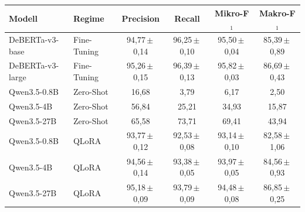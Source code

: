 \begin{tabular}{llcccc}
    \toprule
    \textbf{Modell} & \textbf{Regime} & \textbf{Precision} &
    \textbf{Recall} & \textbf{Mikro-F$_1$} & \textbf{Makro-F$_1$} \\
    \midrule
    DeBERTa-v3-base & Fine-Tuning & 94,77\,$\pm$\,0,14 & 96,25\,$\pm$\,0,10 & 95,50\,$\pm$\,0,04 & 85,39\,$\pm$\,0,89 \\
    DeBERTa-v3-large & Fine-Tuning & 95,26\,$\pm$\,0,15 & 96,39\,$\pm$\,0,13 & 95,82\,$\pm$\,0,03 & 86,69\,$\pm$\,0,43 \\
    \midrule
    Qwen3.5-0.8B & Zero-Shot & 16,68 & 3,79 & 6,17 & 2,50 \\
    Qwen3.5-4B & Zero-Shot & 56,84 & 25,21 & 34,93 & 15,87 \\
    Qwen3.5-27B & Zero-Shot & 65,58 & 73,71 & 69,41 & 43,94 \\
    \midrule
    Qwen3.5-0.8B & QLoRA & 93,77\,$\pm$\,0,12 & 92,53\,$\pm$\,0,08 & 93,14\,$\pm$\,0,10 & 82,58\,$\pm$\,1,06 \\
    Qwen3.5-4B & QLoRA & 94,56\,$\pm$\,0,14 & 93,38\,$\pm$\,0,05 & 93,97\,$\pm$\,0,05 & 84,56\,$\pm$\,0,93 \\
    Qwen3.5-27B & QLoRA & 95,18\,$\pm$\,0,09 & 93,79\,$\pm$\,0,09 & 94,48\,$\pm$\,0,08 & 86,85\,$\pm$\,0,25 \\
    \bottomrule
\end{tabular}
